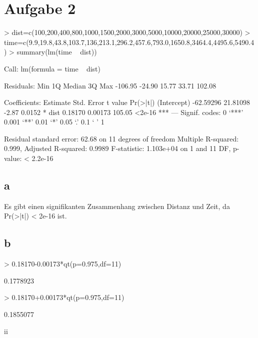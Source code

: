 
\section{Aufgabe 2}
\begin{Schunk}
\begin{Sinput}
> dist=c(100,200,400,800,1000,1500,2000,3000,5000,10000,20000,25000,30000)
> time=c(9.9,19.8,43.8,103.7,136,213.1,296.2,457.6,793.0,1650.8,3464.4,4495.6,5490.4)
> summary(lm(time ~ dist))
\end{Sinput}
\begin{Soutput}
Call:
lm(formula = time ~ dist)

Residuals:
    Min      1Q  Median      3Q     Max 
-106.95  -24.90   15.77   33.71  102.08 

Coefficients:
             Estimate Std. Error t value Pr(>|t|)    
(Intercept) -62.59296   21.81098   -2.87   0.0152 *  
dist          0.18170    0.00173  105.05   <2e-16 ***
---
Signif. codes:  0 ‘***’ 0.001 ‘**’ 0.01 ‘*’ 0.05 ‘.’ 0.1 ‘ ’ 1 

Residual standard error: 62.68 on 11 degrees of freedom
Multiple R-squared: 0.999,	Adjusted R-squared: 0.9989 
F-statistic: 1.103e+04 on 1 and 11 DF,  p-value: < 2.2e-16 
\end{Soutput}
\end{Schunk}

\subsection{a}
Es gibt einen signifikanten Zusammenhang zwischen Distanz und Zeit, 
da Pr(>|t|) < 2e-16 ist. 

\subsection{b}
\begin{Schunk}
\begin{Sinput}
> 0.18170-0.00173*qt(p=0.975,df=11)
\end{Sinput}
\begin{Soutput}
[1] 0.1778923
\end{Soutput}
\begin{Sinput}
> 0.18170+0.00173*qt(p=0.975,df=11)
\end{Sinput}
\begin{Soutput}
[1] 0.1855077
\end{Soutput}
\end{Schunk}
ii


